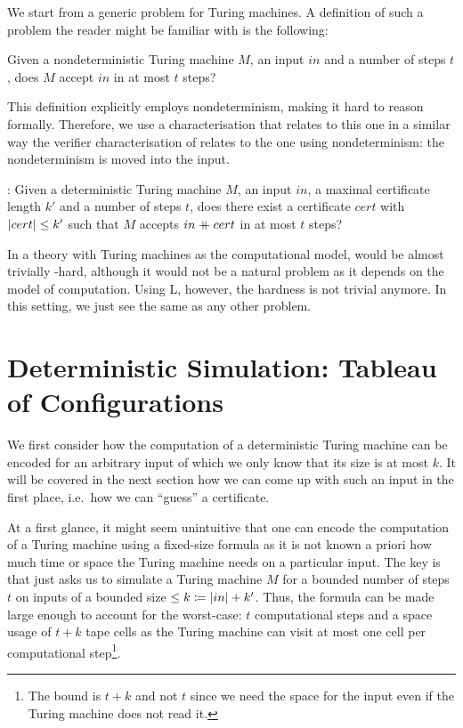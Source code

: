 We start from a generic problem for Turing machines. A definition of such a problem the reader might be familiar with is the following:
\begin{center}
  Given a nondeterministic Turing machine $M$, an input $in$ and a number of steps $t$, does $M$ accept $in$ in at most $t$ steps?
\end{center}
This definition explicitly employs nondeterminism, making it hard to reason formally. Therefore, we use a characterisation that relates to this one in a similar way the verifier characterisation of \NP{} relates to the one using nondeterminism: the nondeterminism is moved into the input.
\begin{center}
  \gennp{}:
  Given a deterministic Turing machine $M$, an input $in$, a maximal certificate length $k'$ and a number of steps $t$, does there exist a certificate $cert$ with $|cert| \le k'$ such that $M$ accepts $in \mathbin{+\mkern-10mu+} cert$ in at most $t$ steps?
\end{center}

In a theory with Turing machines as the computational model, \gennp{} would be almost trivially \NP{}-hard, although it would not be a natural problem as it depends on the model of computation.
Using L, however, the hardness is not trivial anymore. In this setting, we just see \gennp{} the same as any other problem.

\section{Deterministic Simulation: Tableau of Configurations}
We first consider how the computation of a deterministic Turing machine can be encoded for an arbitrary input of which we only know that its size is at most $k$. 
It will be covered in the next section how we can come up with such an input in the first place, i.e.\ how we can ``guess'' a certificate.

At a first glance, it might seem unintuitive that one can encode the computation of a Turing machine using a fixed-size formula as it is not known a priori how much time or space the Turing machine needs on a particular input.
The key is that \gennp{} just asks us to simulate a Turing machine $M$ for a bounded number of steps $t$ on inputs of a bounded size $\le k \coloneqq |in| + k'$. 
Thus, the formula can be made large enough to account for the worst-case: $t$ computational steps and a space usage of $t + k$ tape cells as the Turing machine can visit at most one cell per computational step\footnote{The bound is $t +k$ and not $t$ since we need the space for the input even if the Turing machine does not read it.}. 


